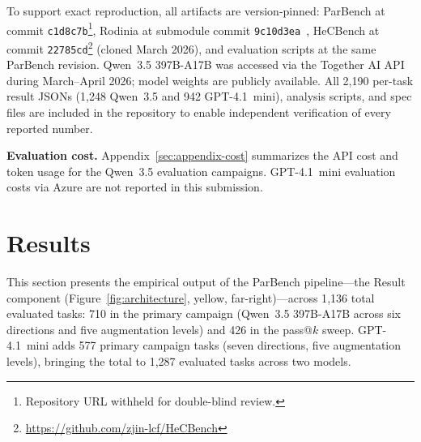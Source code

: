 \documentclass[conference]{IEEEtran}
\begin{document}
To support exact reproduction, all artifacts are version-pinned: ParBench at commit \texttt{c1d8c7b}\footnote{Repository URL withheld for double-blind review.}, Rodinia at submodule commit \texttt{9c10d3ea}~\cite{Rodinia2009}, HeCBench at commit \texttt{22785cd}\footnote{\url{https://github.com/zjin-lcf/HeCBench}} (cloned March 2026), and evaluation scripts at the same ParBench revision. Qwen~3.5 397B-A17B was accessed via the Together AI API during March--April 2026; model weights are publicly available. All 2,190 per-task result JSONs (1,248 Qwen~3.5 and 942 GPT-4.1~mini), analysis scripts, and spec files are included in the repository to enable independent verification of every reported number. %

\textbf{Evaluation cost.} Appendix~\ref{sec:appendix-cost} summarizes the API cost and token usage for the Qwen~3.5 evaluation campaigns. GPT-4.1~mini evaluation costs via Azure are not reported in this submission. %

\section{Results}
\label{sec:results}

This section presents the empirical output of the ParBench pipeline---the Result component (Figure~\ref{fig:architecture}, yellow, far-right)---across 1{,}136 total evaluated tasks: 710 in the primary campaign (Qwen~3.5 397B-A17B across six directions and five augmentation levels) and 426 in the pass@$k$ sweep. GPT-4.1~mini adds 577 primary campaign tasks (seven directions, five augmentation levels), bringing the total to 1{,}287 evaluated tasks across two models. %
\end{document}
